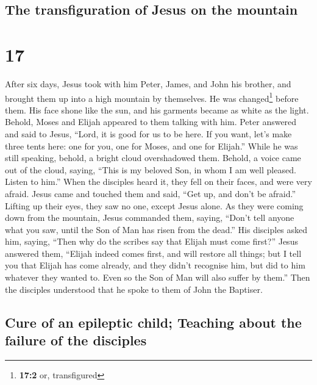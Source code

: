 \hypertarget{the-transfiguration-of-jesus-on-the-mountain}{%
\subsection{The transfiguration of Jesus on the
mountain}\label{the-transfiguration-of-jesus-on-the-mountain}}

\hypertarget{section-16}{%
\section{17}\label{section-16}}

 After six days, Jesus took with him Peter, James, and
John his brother, and brought them up into a high mountain by
themselves.  He was changed\footnote{\textbf{17:2} or,
  transfigured} before them. His face shone like the sun, and his
garments became as white as the light.  Behold, Moses and
Elijah appeared to them talking with him.  Peter answered
and said to Jesus, ``Lord, it is good for us to be here. If you want,
let's make three tents here: one for you, one for Moses, and one for
Elijah.''  While he was still speaking, behold, a bright
cloud overshadowed them. Behold, a voice came out of the cloud, saying,
``This is my beloved Son, in whom I am well pleased. Listen to him.''
 When the disciples heard it, they fell on their faces,
and were very afraid.  Jesus came and touched them and
said, ``Get up, and don't be afraid.''  Lifting up their
eyes, they saw no one, except Jesus alone.  As they were
coming down from the mountain, Jesus commanded them, saying, ``Don't
tell anyone what you saw, until the Son of Man has risen from the
dead.''  His disciples asked him, saying, ``Then why do
the scribes say that Elijah must come first?''  Jesus
answered them, ``Elijah indeed comes first, and will restore all things;
 but I tell you that Elijah has come already, and they
didn't recognise him, but did to him whatever they wanted to. Even so
the Son of Man will also suffer by them.''  Then the
disciples understood that he spoke to them of John the Baptiser.

\hypertarget{cure-of-an-epileptic-child-teaching-about-the-failure-of-the-disciples}{%
\subsection{Cure of an epileptic child; Teaching about the failure of
the
disciples}\label{cure-of-an-epileptic-child-teaching-about-the-failure-of-the-disciples}}

